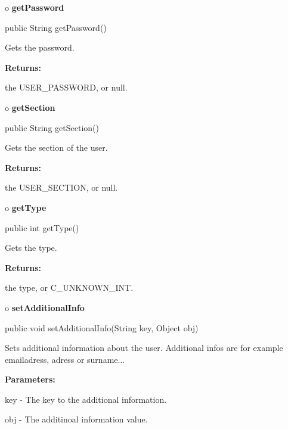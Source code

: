 o {\bf getPassword} 

\begin{PRE}
 public String getPassword()
\end{PRE}

\begin{description}
\htmlDD Gets the password. 

\begin{description}
\item {\bf Returns:}  

the USER\_PASSWORD, or null.  
\end{description}

\end{description}

o {\bf getSection} 

\begin{PRE}
 public String getSection()
\end{PRE}

\begin{description}
\htmlDD Gets the section of the user. 

\begin{description}
\item {\bf Returns:}  

the USER\_SECTION, or null.  
\end{description}

\end{description}

o {\bf getType} 

\begin{PRE}
 public int getType()
\end{PRE}

\begin{description}
\htmlDD Gets the type. 

\begin{description}
\item {\bf Returns:}  

the type, or C\_UNKNOWN\_INT.  
\end{description}

\end{description}

o {\bf setAdditionalInfo} 

\begin{PRE}
 public void setAdditionalInfo(String key,
                               Object obj)
\end{PRE}

\begin{description}
\htmlDD Sets additional information about the user. Additional infos are for
example emailadress, adress or surname... 

\begin{description}
\item {\bf Parameters:}  

key - The key to the additional information.  

obj - The additinoal information value.  
\end{description}

\end{description}

